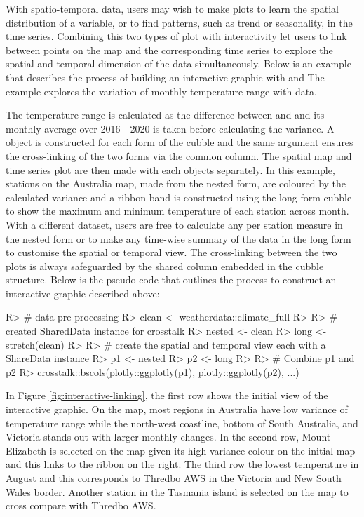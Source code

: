 \documentclass[
]{jss}
\begin{document}
With spatio-temporal data, users may wish to make plots to learn the
spatial distribution of a variable, or to find patterns, such as trend
or seasonality, in the time series. Combining this two types of plot
with interactivity let users to link between points on the map and the
corresponding time series to explore the spatial and temporal dimension
of the data simultaneously. Below is an example that describes the
process of building an interactive graphic with  and
 The example explores the variation of monthly
temperature range with  data.

The temperature range is calculated as the difference between
 and  and its monthly average over 2016 - 2020 is
taken before calculating the variance. A  object is
constructed for each form of the cubble and the same 
argument ensures the cross-linking of the two forms via the common
 column. The spatial map and time series plot are then made
with each  objects separately. In this example,
stations on the Australia map, made from the nested form, are coloured
by the calculated variance and a ribbon band is constructed using the
long form cubble to show the maximum and minimum temperature of each
station across month. With a different dataset, users are free to
calculate any per station measure in the nested form or to make any
time-wise summary of the data in the long form to customise the spatial
or temporal view. The cross-linking between the two plots is always
safeguarded by the shared  column embedded in the cubble
structure. Below is the pseudo code that outlines the process to
construct an interactive graphic described above:

\begin{CodeChunk}
\begin{CodeInput}
R> # data pre-processing
R> clean <- weatherdata::climate_full %
R> 
R> # created SharedData instance for crosstalk
R> nested <- clean %
R> long <- stretch(clean) %
R> 
R> # create the spatial and temporal view each with a ShareData instance
R> p1 <- nested %
R> p2 <- long %
R> 
R> # Combine p1 and p2
R> crosstalk::bscols(plotly::ggplotly(p1), plotly::ggplotly(p2), ...)
\end{CodeInput}
\end{CodeChunk}

In Figure \ref{fig:interactive-linking}, the first row shows the initial
view of the interactive graphic. On the map, most regions in Australia
have low variance of temperature range while the north-west coastline,
bottom of South Australia, and Victoria stands out with larger monthly
changes. In the second row, Mount Elizabeth is selected on the map given
its high variance colour on the initial map and this links to the ribbon
on the right. The third row the lowest temperature in August and this
corresponds to Thredbo AWS in the Victoria and New South Wales border.
Another station in the Tasmania island is selected on the map to cross
compare with Thredbo AWS.
\end{document}
